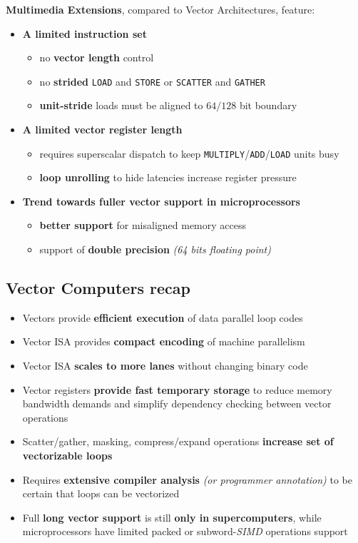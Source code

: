 \documentclass[english]{article}
\begin{document}
\textbf{Multimedia Extensions}, compared to Vector Architectures, feature:

\begin{itemize}
  \item \textbf{A limited instruction set}
        \begin{itemize}[label=\xmark]
          \item no \textbf{vector length} control
          \item no \textbf{strided} \texttt{LOAD} and \texttt{STORE} or \texttt{SCATTER} and \texttt{GATHER}
          \item \textbf{unit-stride} loads must be aligned to \(64/128\) bit boundary
        \end{itemize}
  \item \textbf{A limited vector register length}
        \begin{itemize}[label=\xmark]
          \item requires superscalar dispatch to keep \texttt{MULTIPLY}/\texttt{ADD}/\texttt{LOAD} units busy
          \item \textbf{loop unrolling} to hide latencies increase register pressure
        \end{itemize}
  \item \textbf{Trend towards fuller vector support in microprocessors}
        \begin{itemize}[label=\cmark]
          \item \textbf{better support} for misaligned memory access
          \item support of \textbf{double precision} \textit{(64 bits floating point)}
        \end{itemize}
\end{itemize}

\subsection{Vector Computers recap}

\begin{itemize}
  \item Vectors provide \textbf{efficient execution} of data parallel loop codes
  \item Vector ISA provides \textbf{compact encoding} of machine parallelism
  \item Vector ISA \textbf{scales to more lanes} without changing binary code
  \item Vector registers \textbf{provide fast temporary storage} to reduce memory bandwidth demands and simplify dependency checking between vector operations
  \item Scatter/gather, masking, compress/expand operations \textbf{increase set of vectorizable loops}
  \item Requires \textbf{extensive compiler analysis} \textit{(or programmer annotation)} to be certain that loops can be vectorized
  \item Full \textbf{long vector support} is still \textbf{only in supercomputers}, while microprocessors have limited packed or subword-\textit{SIMD} operations support
\end{itemize}
\end{document}
